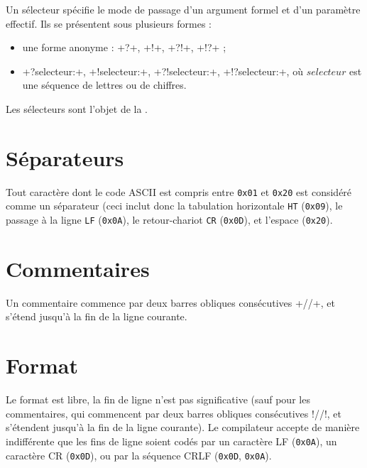 
Un sélecteur spécifie le mode de passage d'un argument formel et d'un paramètre effectif. Ils se présentent sous plusieurs formes :
\begin{itemize}
  \item une forme anonyme : \plm+?+, \plm+!+, \plm+?!+, \plm+!?+ ;
  \item \plm+?selecteur:+, \plm+!selecteur:+, \plm+?!selecteur:+, \plm+!?selecteur:+, où $selecteur$ est une séquence de lettres ou de chiffres.
\end{itemize}



Les sélecteurs sont l'objet de la .

\section{Séparateurs}

Tout caractère dont le code ASCII est compris entre \texttt{0x01} et \texttt{0x20} est considéré comme un séparateur (ceci inclut donc la tabulation horizontale \texttt{HT} (\texttt{0x09}), le passage à la ligne \texttt{LF} (\texttt{0x0A}), le retour-chariot \texttt{CR} (\texttt{0x0D}), et l’espace (\texttt{0x20}).









\section{Commentaires}

Un commentaire commence par deux barres obliques consécutives \plm+//+, et s’étend jusqu’à la fin de la ligne courante.




\section{Format}

Le format est libre, la fin de ligne n’est pas significative (sauf pour les commentaires, qui commencent par deux barres obliques consécutives \plm!//!, et s’étendent jusqu’à la fin de la ligne courante). Le compilateur accepte de manière indifférente que les fins de ligne soient codés par un caractère LF (\texttt{0x0A}), un caractère CR (\texttt{0x0D}), ou par la séquence CRLF (\texttt{0x0D}, \texttt{0x0A}).

